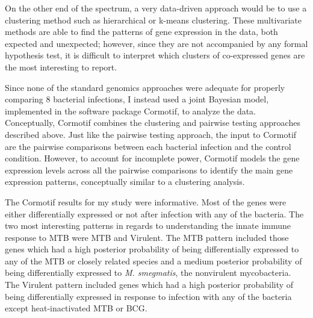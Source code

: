 On the other end of the spectrum, a very data-driven approach would be to use a
clustering method such as hierarchical or k-means clustering. These multivariate
methods are able to find the patterns of gene expression in the data, both
expected and unexpected; however, since they are not accompanied by any formal
hypothesis test, it is difficult to interpret which clusters of co-expressed
genes are the most interesting to report.

Since none of the standard genomics approaches were adequate for properly
comparing 8 bacterial infections, I instead used a joint Bayesian model,
implemented in the software package Cormotif, to analyze the data. Conceptually,
Cormotif combines the clustering and pairwise testing approaches described
above. Just like the pairwise testing approach, the input to Cormotif are the
pairwise comparisons between each bacterial infection and the control
condition. However, to account for incomplete power, Cormotif models the gene
expression levels across all the pairwise comparisons to identify the main gene
expression patterns, conceptually similar to a clustering analysis.

The Cormotif results for my study were informative. Most of the genes were
either differentially expressed or not after infection with any of the
bacteria. The two most interesting patterns in regards to understanding the
innate immune response to MTB were MTB and Virulent.  The MTB pattern included
those genes which had a high posterior probability of being differentially
expressed to any of the MTB or closely related species and a medium posterior
probability of being differentially expressed to \emph{M. smegmatis}, the
nonvirulent mycobacteria. The Virulent pattern included genes which had a high
posterior probability of being differentially expressed in response to infection
with any of the bacteria except heat-inactivated MTB or BCG.

